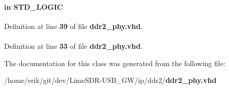 \paragraph[{soft\+\_\+reset\+\_\+n}]{ {\bfseries \textcolor{keywordflow}{in}\textcolor{vhdlchar}{ }} {\bfseries \textcolor{comment}{S\+T\+D\+\_\+\+L\+O\+G\+IC}\textcolor{vhdlchar}{ }} \hspace{0.3cm}{\ttfamily [Port]}}\label{classddr2__phy_a53f1e0221c8ca31730a8efb91589fd7d}


Definition at line {\bf 39} of file {\bf ddr2\+\_\+phy.\+vhd}.

\paragraph[{std\+\_\+logic\+\_\+1164}]{\hspace{0.3cm}{\ttfamily [Package]}}\label{classddr2__phy_acd03516902501cd1c7296a98e22c6fcb}


Definition at line {\bf 33} of file {\bf ddr2\+\_\+phy.\+vhd}.



The documentation for this class was generated from the following file\+:\begin{DoxyCompactItemize}
\item 
/home/erik/git/dev/\+Lime\+S\+D\+R-\/\+U\+S\+B\+\_\+\+G\+W/ip/ddr2/{\bf ddr2\+\_\+phy.\+vhd}\end{DoxyCompactItemize}
